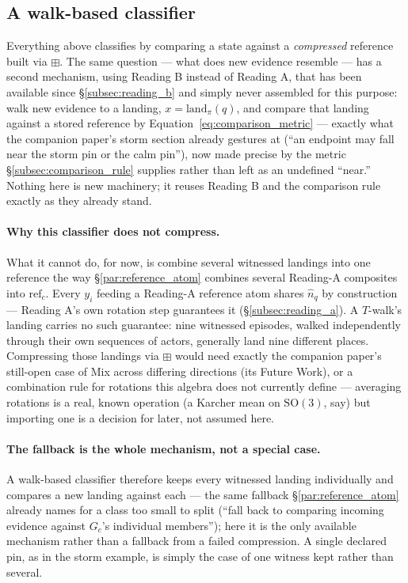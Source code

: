 \documentclass[12pt, a4paper]{article}
\begin{document}
\subsection{A walk-based classifier}
\label{subsec:walk_classifier}

Everything above classifies by comparing a state against a
\emph{compressed} reference built via $\boxplus$. The same question
--- what does new evidence resemble --- has a second mechanism,
using Reading B instead of Reading A, that has been available since
\S\ref{subsec:reading_b} and simply never assembled for this purpose:
walk new evidence to a landing, $x=\mathrm{land}_\pi(q)$, and compare
that landing against a stored reference by
Equation~\eqref{eq:comparison_metric} --- exactly what the companion
paper's storm section already gestures at (``an endpoint may fall
near the storm pin or the calm pin''), now made precise by the metric
\S\ref{subsec:comparison_rule} supplies rather than left as an
undefined ``near.'' Nothing here is new machinery; it reuses Reading
B and the comparison rule exactly as they already stand.

\paragraph{Why this classifier does not compress.}
What it cannot do, for now, is combine several witnessed landings
into one reference the way \S\ref{par:reference_atom} combines
several Reading-A composites into $\mathrm{ref}_c$. Every $y_i$
feeding a Reading-A reference atom shares $\hat n_q$ by construction
--- Reading A's own rotation step guarantees it
(\S\ref{subsec:reading_a}). A $T$-walk's landing carries no such
guarantee: nine witnessed episodes, walked independently through
their own sequences of actors, generally land nine different places.
Compressing those landings via $\boxplus$ would need exactly the
companion paper's still-open case of Mix across differing directions
(its Future Work), or a combination rule for rotations this algebra
does not currently define --- averaging rotations is a real, known
operation (a Karcher mean on $\mathrm{SO}(3)$, say) but importing one
is a decision for later, not assumed here.

\paragraph{The fallback is the whole mechanism, not a special case.}
A walk-based classifier therefore keeps every witnessed landing
individually and compares a new landing against each --- the same
fallback \S\ref{par:reference_atom} already names for a class too
small to split (``fall back to comparing incoming evidence against
$G_c$'s individual members''); here it is the only available
mechanism rather than a fallback from a failed compression. A single
declared pin, as in the storm example, is simply the case of one
witness kept rather than several.
\end{document}

